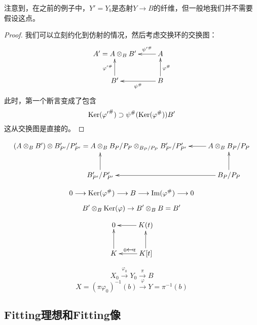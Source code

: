 注意到，在之前的例子中，$Y'=Y_b$是态射$Y\to B$的纤维，但一般地我们并不需要假设这点。

\begin{proof}
我们可以立刻约化到仿射的情况，然后考虑交换环的交换图：
\[
    \xymatrix{
        A'=A\otimes_B B'&A\ar[l]_-{{\psi'}^\#}\\
        B'\ar[u]^{{\varphi'}^\#}&B\ar[l]^-{\psi^\#}\ar[u]_{\varphi^\#}
    }
\]
此时，第一个断言变成了包含
\[
    \operatorname{Ker}({\varphi'}^\#) \supset \psi^{\#}(\operatorname{Ker}(\varphi^{\#})) B'
\]
这从交换图是直接的。

\nottran
\end{proof}

\[
    \xymatrix{
        (A \otimes_B B') \otimes B_{P'}' / P_{P'}'=A \otimes_B B_P / P_P \otimes_{B_P / P_P} B_{P^{\prime}}^{\prime} / P_{P^{\prime}}^{\prime}&A \otimes_B B_P / P_P\ar[l]\\
        B_{P'}' / P_{P'}'\ar[u]&B_P / P_P\ar[l]\ar[u]
    }
\]

\[
    0 \longrightarrow \operatorname{Ker}(\varphi^{\#}) \longrightarrow B \longrightarrow \operatorname{Im}(\varphi^{\#}) \longrightarrow 0
\]

\[
    B' \otimes_B \operatorname{Ker}(\varphi) \rightarrow B' \otimes_B B=B'
\]


\[
    \xymatrix{
        0 & K(t)\ar[l]\\
        K\ar[u]&K[t]\ar[l]_{0 \mapsfrom t}\ar[u]
    }
\]

\[
    X_0 \stackrel{\varphi_0}{\longrightarrow} Y_0 \stackrel{\pi}{\longrightarrow} B
\]
\[
    X=(\pi \varphi_0)^{-1}(b) \stackrel{\varphi}{\longrightarrow} Y=\pi^{-1}(b)
\]

\subsection{Fitting理想和Fitting像}\label{s:5.1.3}